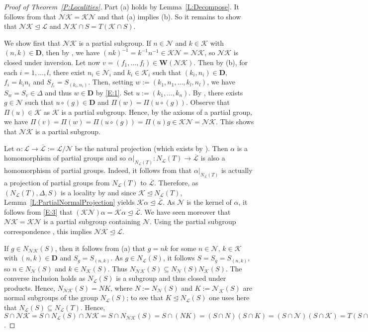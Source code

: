 \documentclass[reqno,11pt]{amsart}
\numberwithin{equation}{section}
\theoremstyle{definition}
\renewcommand{\L}{\mathcal{L}}
\newcommand{\N}{\mathcal{N}}
\newcommand{\K}{\mathcal{K}}
\newcommand{\D}{\mathbf{D}}
\newcommand{\ov}{\overline}
\newcommand{\W}{\mathbf{W}}
\begin{document}
\begin{proof}[Proof of Theorem~\ref{P:Localities}]
Part (a) holds by Lemma~\ref{L:Decompose}. It follows from \cite[Lemma~3.2]{Chermak:2015} that $\N\K=\K\N$ and that (a) implies (b). So it remains to show that $\N\K\unlhd\L$ and $\N\K\cap S=T(\K\cap S)$. 

\smallskip

We show first that $\N\K$ is a partial subgroup. If $n\in\N$ and $k\in\K$ with $(n,k)\in\D$, then by \cite[Lemma~1.4(f)]{Chermak:2015}, we have $(nk)^{-1}=k^{-1}n^{-1}\in\K\N=\N\K$, so  $\N\K$ is closed under inversion. Let now $v=(f_1,\dots,f_l)\in\W(\N\K)$. Then by (b), for each $i=1,\dots,l$, there exist $n_i\in\N_i$ and $k_i\in\K_i$ such that $(k_i,n_i)\in\D$, $f_i=k_in_i$ and $S_{f_i}=S_{(k_i,n_i)}$. Then, setting $w:=(k_1,n_1,\dots,k_l,n_l)$, we have $S_w=S_v\in\Delta$ and thus $w\in\D$ by \eqref{E:1}. 
Set $u:=(k_1,\dots,k_n)$. By \cite[Lemma~3.4]{Chermak:2015}, there exists $g\in\N$ such that $u\circ (g)\in\D$ and $\Pi(w)=\Pi(u\circ (g))$. Observe that $\Pi(u)\in\K$ as $\K$ is a partial subgroup. Hence, by the axioms of a partial group, we have $\Pi(v)=\Pi(w)=\Pi(u\circ(g))=\Pi(u)g\in\K\N=\N\K$. This shows that $\N\K$ is a partial subgroup.

\smallskip

Let $\alpha\colon \L\rightarrow \ov{\L}:=\L/\N$ be the natural projection (which exists by \cite[Lemma~3.16, Corollary~4.5]{Chermak:2015}). Then $\alpha$ is a homomorphism of partial groups and so $\alpha|_{N_\L(T)}\colon N_\L(T)\rightarrow \ov{\L}$ is also a homomorphism of partial groups. Indeed, it follows from \cite[Theorem~4.3(b)]{Chermak:2015} that  $\alpha|_{N_\L(T)}$ is actually a projection of partial groups from $N_\L(T)$ to $\ov{\L}$. Therefore, as  $(N_\L(T),\Delta,S)$ is a locality by \cite[Lemma~2.12]{Chermak:2015} and since $\K\unlhd N_\L(T)$, Lemma~\ref{L:PartialNormalProjection}  yields $\K\alpha\unlhd\ov{\L}$. As $\N$ is the kernel of $\alpha$, it follows from \eqref{E:3} that $(\K\N)\alpha=\K\alpha\unlhd\ov{\L}$. We have seen moreover that $\N\K=\K\N$ is a partial subgroup containing $\N$. Using the partial subgroup correspondence \cite[Proposition~4.7]{Chermak:2015}, this implies $\N\K\unlhd\L$.

\smallskip

If $g\in N_{\N\K}(S)$, then it follows from (a) that $g=nk$ for some $n\in\N$, $k\in\K$ with $(n,k)\in\D$ and $S_g=S_{(n,k)}$. As $g\in N_\L(S)$, it follows $S=S_g=S_{(n,k)}$, so $n\in N_\N(S)$ and $k\in N_\K(S)$. Thus $N_{\N\K}(S)\subseteq  N_\N(S)N_\K(S)$. The converse inclusion holds as $N_\L(S)$ is a subgroup and thus closed under products. Hence, $N_{\N\K}(S)=NK$, where $N:=N_\N(S)$ and $K:=\N_\K(S)$ are normal subgroups of the group $N_\L(S)$; to see that $K\unlhd N_\L(S)$ one uses here that  $N_\L(S)\subseteq N_\L(T)$. Hence, $S\cap \N\K=S\cap N_\L(S)\cap \N\K=S\cap N_{\N\K}(S)=S\cap (NK)=(S\cap N)(S\cap K)=(S\cap \N)(S\cap \K)=T(S\cap\K)$.
\end{proof}
\end{document}
